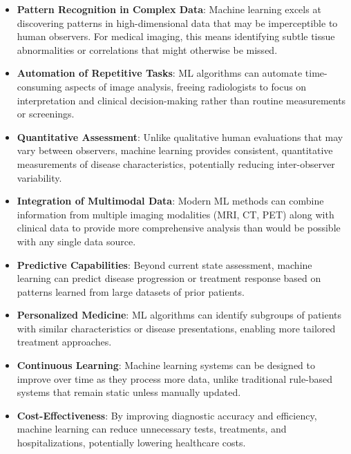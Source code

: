 \begin{itemize}
  \item \textbf{Pattern Recognition in Complex Data}: Machine learning excels at discovering patterns in high-dimensional data that may be imperceptible to human observers. For medical imaging, this means identifying subtle tissue abnormalities or correlations that might otherwise be missed.

  \item \textbf{Automation of Repetitive Tasks}: ML algorithms can automate time-consuming aspects of image analysis, freeing radiologists to focus on interpretation and clinical decision-making rather than routine measurements or screenings.

  \item \textbf{Quantitative Assessment}: Unlike qualitative human evaluations that may vary between observers, machine learning provides consistent, quantitative measurements of disease characteristics, potentially reducing inter-observer variability.

  \item \textbf{Integration of Multimodal Data}: Modern ML methods can combine information from multiple imaging modalities (MRI, CT, PET) along with clinical data to provide more comprehensive analysis than would be possible with any single data source.

  \item \textbf{Predictive Capabilities}: Beyond current state assessment, machine learning can predict disease progression or treatment response based on patterns learned from large datasets of prior patients.

  \item \textbf{Personalized Medicine}: ML algorithms can identify subgroups of patients with similar characteristics or disease presentations, enabling more tailored treatment approaches.

  \item \textbf{Continuous Learning}: Machine learning systems can be designed to improve over time as they process more data, unlike traditional rule-based systems that remain static unless manually updated.

  \item \textbf{Cost-Effectiveness}: By improving diagnostic accuracy and efficiency, machine learning can reduce unnecessary tests, treatments, and hospitalizations, potentially lowering healthcare costs.
\end{itemize}

